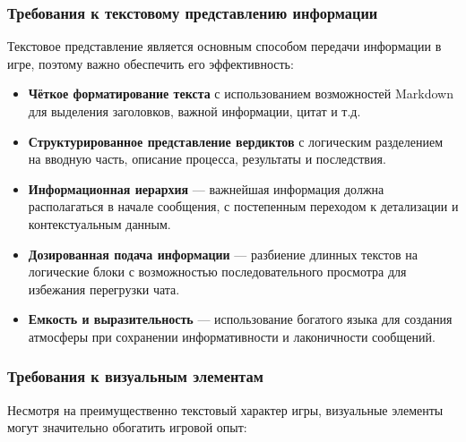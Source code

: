 \subsubsection{Требования к текстовому представлению информации}

Текстовое представление является основным способом передачи информации в игре, поэтому важно обеспечить его эффективность:

\begin{itemize}
    \item \textbf{Чёткое форматирование текста} с использованием возможностей Markdown для выделения заголовков, важной информации, цитат и т.д.

    \item \textbf{Структурированное представление вердиктов} с логическим разделением на вводную часть, описание процесса, результаты и последствия.

    \item \textbf{Информационная иерархия} — важнейшая информация должна располагаться в начале сообщения, с постепенным переходом к детализации и контекстуальным данным.

    \item \textbf{Дозированная подача информации} — разбиение длинных текстов на логические блоки с возможностью последовательного просмотра для избежания перегрузки чата.

    \item \textbf{Емкость и выразительность} — использование богатого языка для создания атмосферы при сохранении информативности и лаконичности сообщений.
\end{itemize}

\subsubsection{Требования к визуальным элементам}

Несмотря на преимущественно текстовый характер игры, визуальные элементы могут значительно обогатить игровой опыт:

